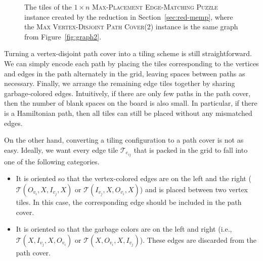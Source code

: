\documentclass[11pt]{article}
\begin{document}
\begin{figure}[h!]
	\centering
%		

	\begin{subfigure}[c]{\textwidth}
		\centering
		\scalebox{0.8}{}
	\end{subfigure}
	\vspace{4pt}

	\begin{subfigure}[c]{\textwidth}
		\centering
		\scalebox{0.8}{}
	\end{subfigure}

	\caption{The tiles of the \textsc{$1 \times n$ Max-Placement Edge-Matching Puzzle} instance created by the reduction in Section~\ref{sec:red-memp}, where the \textsc{Max Vertex-Disjoint Path Cover(2)} instance is the same graph from Figure~\ref{fig:graph2}.}
	\label{fig:tiles}
\end{figure}

Turning a vertex-disjoint path cover into a tiling scheme is still straightforward. We can simply encode each path by placing the tiles corresponding to the vertices and edges in the path alternately in the grid, leaving spaces between paths as necessary. Finally, we arrange the remaining edge tiles together by sharing garbage-colored edges. Intuitively, if there are only few paths in the path cover, then the number of blank spaces on the board is also small. In particular, if there is a Hamiltonian path, then all tiles can still be placed without any mismatched edges. %

On the other hand, converting a tiling configuration to a path cover is not as easy. Ideally, we want every edge tile $\mathcal{T}_{e_{ij}}$ that is packed in the grid to fall into one of the following categories.
\begin{itemize}
\item It is oriented so that the vertex-colored edges are on the left and the right ($\mathcal{T}(O_{v_i}, X, I_{v_j}, X)$ or $\mathcal{T}(I_{v_j}, X, O_{v_i}, X)$) and is placed between two vertex tiles. In this case, the corresponding edge should be included in the path cover.
\item It is oriented so that the garbage colors are on the left and right (i.e., $\mathcal{T}(X, I_{v_j}, X, O_{v_i})$ or $\mathcal{T}(X, O_{v_i}, X, I_{v_j})$). These edges are discarded from the path cover.
\end{itemize}
\end{document}

